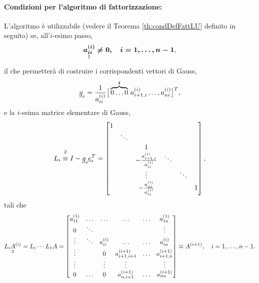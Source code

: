 \paragraph{Condizioni per l'algoritmo di fattorizzazione:}
L'algoritmo è utilizzabile (vedere il Teorema \ref{th:condDefFattLU} definito in seguito) se, all'$i$-esimo passo,
\begin{equation}\label{eq:condDefElemGauss}
    \underset{\footnotemark}{\boldsymbol{a_{ii}^{(i)}}}\boldsymbol{\neq 0,\quad i = 1,\hdots, n-1},
\end{equation}
il che permetterà di costruire i corrispondenti vettori di Gauss,
\begin{equation}
    \uline g_i = \frac{1}{a_{ii}^{(i)}}\big[\overbrace{0\hdots 0}^{\boldsymbol i}\,a_{i+1,i}^{(i)}\hdots, a_{ni}^{(i)}\big]^T,
\end{equation}
e la $i$-esima matrice elementare di Gauss,
\begin{equation}\label{eq:iamatrElemGauss}
    L_i\overset{\footnotemark}{\equiv} I-\uline g_i \uline e_i^T = 
    \begin{bmatrix}
        1 & & &\\
        & \ddots & &\\
        & & 1 &\\
        & & -\frac{a_{i+1,i}^{(i)}}{a_{ii}^{(i)}}&\ddots&\\
        & & \vdots & &\ddots &\\
        & & -\frac{a_{ni}^{(i)}}{a_{ii}^{(i)}} & & & 1
    \end{bmatrix},
\end{equation}
tali che
\begin{equation}\label{eq:A^i}
    \underset{\footnotemark}{L_iA^{(i)}} = L_i\cdots L_1 A=
    \begin{bmatrix}
        a_{11}^{(1)} & \hdots & \hdots & \hdots & \hdots & a_{1n}^{(1)}\\
        0 & \ddots & & & & \vdots\\
        \vdots & \ddots & a_{ii}^{(i)} & \hdots & \hdots & a_{in}^{(i)}\\
        \vdots & & 0 & a_{i+1,i+1}^{(i+1)} & \hdots & a_{i+1, n}^{(i+1)}\\
        \vdots & & \vdots & \vdots & & \vdots\\
        0 & \hdots & 0 & a_{n,i+1}^{(i+1)} & \hdots & a_{nn}^{(i+1)}
    \end{bmatrix}\equiv A^{(i+1)},\quad i = 1, \hdots, n-1.
\end{equation}

